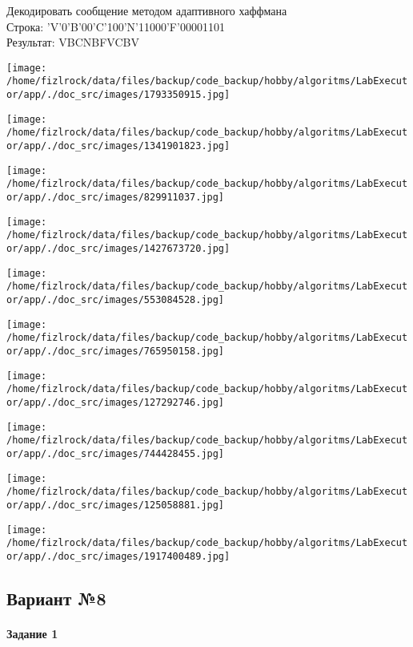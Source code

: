 \documentclass[a4paper, 12pt]{article}
\begin{document}
Декодировать сообщение методом адаптивного хаффмана \\
Строка: 
'V'0'B'00'C'100'N'11000'F'00001101\\
Результат: VBCNBFVCBV

\texttt{[image: /home/fizlrock/data/files/backup/code\_backup/hobby/algoritms/LabExecutor/app/./doc\_src/images/1793350915.jpg]}

\texttt{[image: /home/fizlrock/data/files/backup/code\_backup/hobby/algoritms/LabExecutor/app/./doc\_src/images/1341901823.jpg]}

\texttt{[image: /home/fizlrock/data/files/backup/code\_backup/hobby/algoritms/LabExecutor/app/./doc\_src/images/829911037.jpg]}

\texttt{[image: /home/fizlrock/data/files/backup/code\_backup/hobby/algoritms/LabExecutor/app/./doc\_src/images/1427673720.jpg]}

\texttt{[image: /home/fizlrock/data/files/backup/code\_backup/hobby/algoritms/LabExecutor/app/./doc\_src/images/553084528.jpg]}

\texttt{[image: /home/fizlrock/data/files/backup/code\_backup/hobby/algoritms/LabExecutor/app/./doc\_src/images/765950158.jpg]}

\texttt{[image: /home/fizlrock/data/files/backup/code\_backup/hobby/algoritms/LabExecutor/app/./doc\_src/images/127292746.jpg]}

\texttt{[image: /home/fizlrock/data/files/backup/code\_backup/hobby/algoritms/LabExecutor/app/./doc\_src/images/744428455.jpg]}

\texttt{[image: /home/fizlrock/data/files/backup/code\_backup/hobby/algoritms/LabExecutor/app/./doc\_src/images/125058881.jpg]}

\texttt{[image: /home/fizlrock/data/files/backup/code\_backup/hobby/algoritms/LabExecutor/app/./doc\_src/images/1917400489.jpg]}
\pagebreak
\subsection{Вариант №8}
\paragraph{Задание 1}
\end{document}
